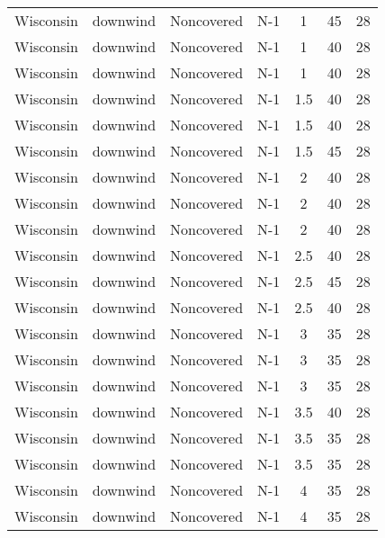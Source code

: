 \documentclass{article}
\begin{document}
\begin{longtable}[c]{ccccccc}
Wisconsin & downwind  & Noncovered & N-1             & 1            & 45          & 28  \\
Wisconsin & downwind  & Noncovered & N-1             & 1            & 40          & 28  \\
Wisconsin & downwind  & Noncovered & N-1             & 1            & 40          & 28  \\
Wisconsin & downwind  & Noncovered & N-1             & 1.5          & 40          & 28  \\
Wisconsin & downwind  & Noncovered & N-1             & 1.5          & 40          & 28  \\
Wisconsin & downwind  & Noncovered & N-1             & 1.5          & 45          & 28  \\
Wisconsin & downwind  & Noncovered & N-1             & 2            & 40          & 28  \\
Wisconsin & downwind  & Noncovered & N-1             & 2            & 40          & 28  \\
Wisconsin & downwind  & Noncovered & N-1             & 2            & 40          & 28  \\
Wisconsin & downwind  & Noncovered & N-1             & 2.5          & 40          & 28  \\
Wisconsin & downwind  & Noncovered & N-1             & 2.5          & 45          & 28  \\
Wisconsin & downwind  & Noncovered & N-1             & 2.5          & 40          & 28  \\
Wisconsin & downwind  & Noncovered & N-1             & 3            & 35          & 28  \\
Wisconsin & downwind  & Noncovered & N-1             & 3            & 35          & 28  \\
Wisconsin & downwind  & Noncovered & N-1             & 3            & 35          & 28  \\
Wisconsin & downwind  & Noncovered & N-1             & 3.5          & 40          & 28  \\
Wisconsin & downwind  & Noncovered & N-1             & 3.5          & 35          & 28  \\
Wisconsin & downwind  & Noncovered & N-1             & 3.5          & 35          & 28  \\
Wisconsin & downwind  & Noncovered & N-1             & 4            & 35          & 28  \\
Wisconsin & downwind  & Noncovered & N-1             & 4            & 35          & 28  \\

\end{longtable}
\end{document}
